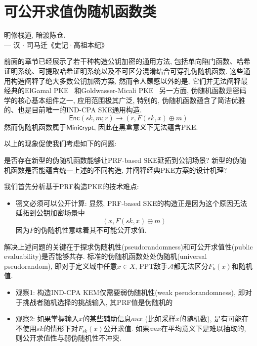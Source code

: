 \section{可公开求值伪随机函数类}
\begin{center}
    明修栈道, 暗渡陈仓.  \\
                \hfill --- 汉 $\cdot$ 司马迁《史记·高祖本纪》
\end{center}

前面的章节已经展示了若干种构造公钥加密的通用方法, 包括单向陷门函数、哈希证明系统、可提取哈希证明系统以及不可区分混淆结合可穿孔伪随机函数. 
这些通用构造阐释了绝大多数公钥加密方案, 然而令人颇感以外的是, 它们并无法阐释最经典的ElGamal PKE~\cite{ElGamal-IEEE-IT-1985}
和Goldwasser-Micali PKE~\cite{GM-JCSS-1984}
另一方面, 伪随机函数是密码学的核心基本组件之一, 应用范围极其广泛, 
特别的, 伪随机函数蕴含了简洁优雅的、也是目前唯一的IND-CPA SKE通用构造.
\begin{equation*}
    \mathsf{Enc}(sk, m; r) \rightarrow (r, F(sk, x) \oplus m)
\end{equation*}
然而伪随机函数属于$\mathsf{Minicrypt}$, 因此在黑盒意义下无法蕴含PKE. 

以上的现象促使我们考虑如下的问题: 
\begin{thinking}
    是否存在新型的伪随机函数能够让PRF-based SKE延拓到公钥场景? 新型的伪随机函数是否能蕴含统一上述的不同构造, 并阐释经典PKE方案的设计机理?
\end{thinking}

我们首先分析基于PRF构造PKE的技术难点: 
\begin{itemize}
\item 密文必须可以公开计算: 显然, PRF-based SKE的构造正是因为这个原因无法延拓到公钥加密场景中
\begin{equation*}
    (x, F(sk, x) \oplus m)
\end{equation*}
因为$F$的伪随机性意味着其不可能公开求值.  
\end{itemize}

解决上述问题的关键在于探求伪随机性(pseudorandomness)和可公开求值性(public evaluability)是否能够共存.  
标准的伪随机函数处处伪随机(universal pseudorandom), 即对于定义域中任意$x \in X$, PPT敌手$\mathcal{A}$都无法区分$F_k(x)$和随机值. 
\begin{itemize}
\item 观察1: 构造IND-CPA KEM仅需要弱伪随机性(weak pseudorandomness), 即对于挑战者随机选择的挑战输入, 其PRF值是伪随机的 

\item 观察2: 如果掌握输入$x$的某些辅助信息$aux$ (比如采样$x$的随机数), 是有可能在不使用$sk$的情形下对$F_{sk}(x)$公开求值. 
	如果$aux$在平均意义下是难以抽取的, 则公开求值性与弱伪随机性不冲突.  
\end{itemize}

